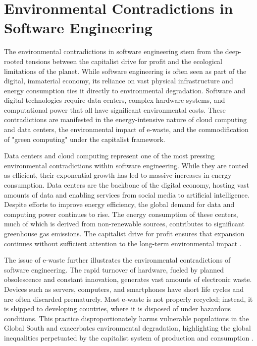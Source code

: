 \section{Environmental Contradictions in Software Engineering}

The environmental contradictions in software engineering stem from the deep-rooted tensions between the capitalist drive for profit and the ecological limitations of the planet. While software engineering is often seen as part of the digital, immaterial economy, its reliance on vast physical infrastructure and energy consumption ties it directly to environmental degradation. Software and digital technologies require data centers, complex hardware systems, and computational power that all have significant environmental costs. These contradictions are manifested in the energy-intensive nature of cloud computing and data centers, the environmental impact of e-waste, and the commodification of "green computing" under the capitalist framework.

Data centers and cloud computing represent one of the most pressing environmental contradictions within software engineering. While they are touted as efficient, their exponential growth has led to massive increases in energy consumption. Data centers are the backbone of the digital economy, hosting vast amounts of data and enabling services from social media to artificial intelligence. Despite efforts to improve energy efficiency, the global demand for data and computing power continues to rise. The energy consumption of these centers, much of which is derived from non-renewable sources, contributes to significant greenhouse gas emissions. The capitalist drive for profit ensures that expansion continues without sufficient attention to the long-term environmental impact \cite[pp.~189-192]{glanz2012}.

The issue of e-waste further illustrates the environmental contradictions of software engineering. The rapid turnover of hardware, fueled by planned obsolescence and constant innovation, generates vast amounts of electronic waste. Devices such as servers, computers, and smartphones have short life cycles and are often discarded prematurely. Most e-waste is not properly recycled; instead, it is shipped to developing countries, where it is disposed of under hazardous conditions. This practice disproportionately harms vulnerable populations in the Global South and exacerbates environmental degradation, highlighting the global inequalities perpetuated by the capitalist system of production and consumption \cite[pp.~62-64]{grossman2006}.

